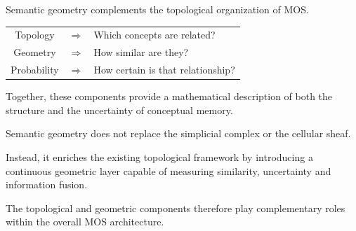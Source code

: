 \begin{highlightbox}


\BodyFont

Semantic geometry complements the topological organization of MOS.

\begin{center}

\begin{tabular}{ccl}

Topology
&
$\Longrightarrow$
&
Which concepts are related?

\\[3mm]

Geometry
&
$\Longrightarrow$
&
How similar are they?

\\[3mm]

Probability
&
$\Longrightarrow$
&
How certain is that relationship?

\end{tabular}

\end{center}

Together, these components provide a mathematical description of both the
structure and the uncertainty of conceptual memory.

\end{highlightbox}


\begin{remarkbox}

\BodyFont

Semantic geometry does not replace the simplicial complex or the cellular
sheaf.

Instead, it enriches the existing topological framework by introducing a
continuous geometric layer capable of measuring similarity, uncertainty and
information fusion.

The topological and geometric components therefore play complementary
roles within the overall MOS architecture.

\end{remarkbox}